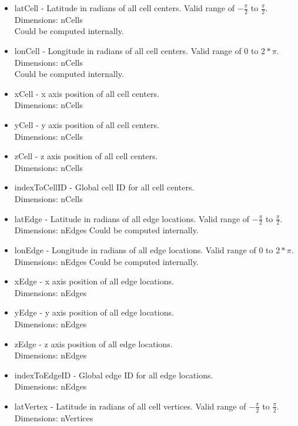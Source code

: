 \documentclass[11pt]{report}
\begin{document}
\begin{itemize}
	\item latCell - Latitude in radians of all cell centers. Valid range of $-\frac{\pi}{2}$ to $\frac{\pi}{2}$.\\
		  Dimensions: nCells \\
		  Could be computed internally. 
	\item lonCell - Longitude in radians of all cell centers. Valid range of $0$ to $2*\pi$. \\
		  Dimensions: nCells \\
		  Could be computed internally. 
	\item xCell - x axis position of all cell centers. \\
		  Dimensions: nCells
	\item yCell - y axis position of all cell centers. \\
		  Dimensions: nCells
	\item zCell - z axis position of all cell centers. \\
		  Dimensions: nCells
	\item indexToCellID - Global cell ID for all cell centers. \\
		  Dimensions: nCells
	\item latEdge - Latitude in radians of all edge locations. Valid range of $-\frac{\pi}{2}$ to $\frac{\pi}{2}$. \\
		  Dimensions: nEdges
		  Could be computed internally. 
	\item lonEdge - Longitude in radians of all edge locations. Valid range of $0$ to $2*\pi$. \\
		  Dimensions: nEdges
		  Could be computed internally. 
	\item xEdge - x axis position of all edge locations. \\
		  Dimensions: nEdges
	\item yEdge - y axis position of all edge locations. \\
		  Dimensions: nEdges
	\item zEdge - z axis position of all edge locations. \\
		  Dimensions: nEdges
	\item indexToEdgeID - Global edge ID for all edge locations. \\
		  Dimensions: nEdges
	\item latVertex - Latitude in radians of all cell vertices. Valid range of $-\frac{\pi}{2}$ to $\frac{\pi}{2}$. \\
		  Dimensions: nVertices

\end{itemize}
\end{document}
